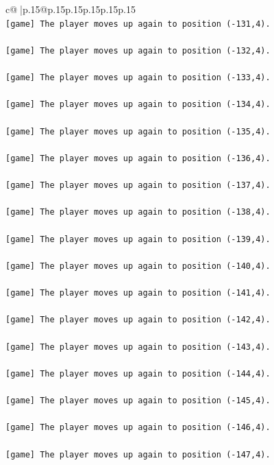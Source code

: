 \documentclass{article}
\begin{document}
{\begin{supertabular}{c@{$\;$}|p{.15\linewidth}@{}p{.15\linewidth}p{.15\linewidth}p{.15\linewidth}p{.15\linewidth}p{.15\linewidth}}
{{{\\ 
\texttt{{[}game{]} The player moves up again to position ({-}131,4).} \\
\\ 
\texttt{{[}game{]} The player moves up again to position ({-}132,4).} \\
\\ 
\texttt{{[}game{]} The player moves up again to position ({-}133,4).} \\
\\ 
\texttt{{[}game{]} The player moves up again to position ({-}134,4).} \\
\\ 
\texttt{{[}game{]} The player moves up again to position ({-}135,4).} \\
\\ 
\texttt{{[}game{]} The player moves up again to position ({-}136,4).} \\
\\ 
\texttt{{[}game{]} The player moves up again to position ({-}137,4).} \\
\\ 
\texttt{{[}game{]} The player moves up again to position ({-}138,4).} \\
\\ 
\texttt{{[}game{]} The player moves up again to position ({-}139,4).} \\
\\ 
\texttt{{[}game{]} The player moves up again to position ({-}140,4).} \\
\\ 
\texttt{{[}game{]} The player moves up again to position ({-}141,4).} \\
\\ 
\texttt{{[}game{]} The player moves up again to position ({-}142,4).} \\
\\ 
\texttt{{[}game{]} The player moves up again to position ({-}143,4).} \\
\\ 
\texttt{{[}game{]} The player moves up again to position ({-}144,4).} \\
\\ 
\texttt{{[}game{]} The player moves up again to position ({-}145,4).} \\
\\ 
\texttt{{[}game{]} The player moves up again to position ({-}146,4).} \\
\\ 
\texttt{{[}game{]} The player moves up again to position ({-}147,4).} \\
}}}
\end{supertabular}}
\end{document}
